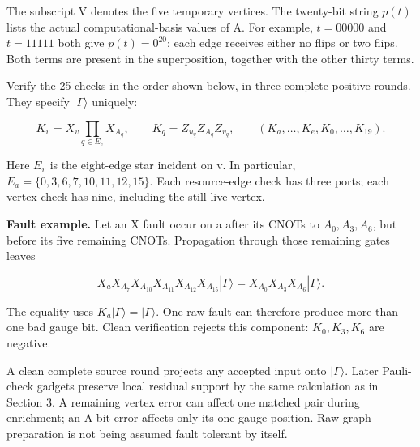 \documentclass[11pt]{article}
\begin{document}
The subscript V denotes the five temporary vertices. The twenty-bit string \(p(t)\) lists the actual computational-basis values of A. For example, \(t=00000\) and \(t=11111\) both give \(p(t)=0^{20}\): each edge receives either no flips or two flips. Both terms are present in the superposition, together with the other thirty terms.

Verify the 25 checks in the order shown below, in three complete positive rounds. They specify \(|\Gamma\rangle\) uniquely:

\[
K_v=X_v\prod_{q\in E_v}X_{A_q},\qquad
K_q=Z_{u_q}Z_{A_q}Z_{v_q},\qquad
(K_a,\ldots,K_e,K_0,\ldots,K_{19}).
\]

Here \(E_v\) is the eight-edge star incident on v. In particular, \(E_a=\{0,3,6,7,10,11,12,15\}\). Each resource-edge check has three ports; each vertex check has nine, including the still-live vertex.

\begin{center}\begin{minipage}{\linewidth}

\end{minipage}\end{center}

\begin{center}\begin{minipage}{\linewidth}

\end{minipage}\end{center}

\textbf{Fault example.} Let an X fault occur on a after its CNOTs to \(A_0,A_3,A_6\), but before its five remaining CNOTs. Propagation through those remaining gates leaves

\[
X_aX_{A_7}X_{A_{10}}X_{A_{11}}X_{A_{12}}X_{A_{15}}|\Gamma\rangle
=X_{A_0}X_{A_3}X_{A_6}|\Gamma\rangle.
\]

The equality uses \(K_a|\Gamma\rangle=|\Gamma\rangle\). One raw fault can therefore produce more than one bad gauge bit. Clean verification rejects this component: \(K_0,K_3,K_6\) are negative.

A clean complete source round projects any accepted input onto \(|\Gamma\rangle\). Later Pauli-check gadgets preserve local residual support by the same calculation as in Section 3. A remaining vertex error can affect one matched pair during enrichment; an A bit error affects only its one gauge position. Raw graph preparation is not being assumed fault tolerant by itself.
\end{document}
